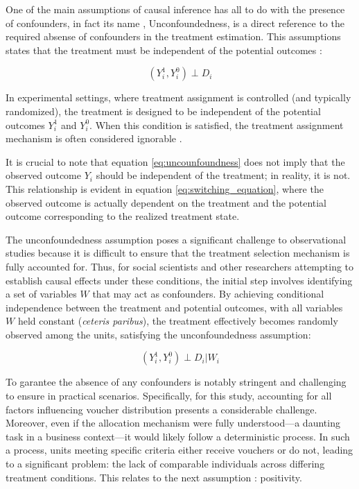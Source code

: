 One of the main assumptions of causal inference has all to do with the presence of confounders, in fact its name , Unconfoundedness, is a direct reference to the required absense of confounders in the treatment estimation. This
assumptions states that the treatment must be independent of the potential outcomes :

\begin{equation}
  (Y_i^1, Y_i^0) \perp D_i
  \label{eq:uncounfoundness}
\end{equation}

In experimental settings, where treatment assignment is controlled (and typically randomized), the treatment is designed to be independent of the potential outcomes $Y_i^1$ and $Y_i^0$. When this condition is satisfied, the 
treatment assignment mechanism is often considered ignorable \parencite{morgan_counterfactuals_2015}.

It is crucial to note that equation \ref{eq:uncounfoundness} does not imply that the observed outcome $Y_i$ should be independent of the treatment; in reality, it is not. This relationship is evident in equation 
\ref{eq:switching_equation}, where the observed outcome is actually dependent on the treatment and the potential outcome corresponding to the realized treatment state.

The unconfoundedness assumption poses a significant challenge to observational studies because it is difficult to ensure that the treatment selection mechanism is fully accounted for. Thus, for social scientists and other researchers 
attempting to establish causal effects under these conditions, the initial step involves identifying a set of variables $W$ that may act as confounders. By achieving conditional independence between the treatment and potential outcomes, with all variables 
$W$ held constant (\textit{ceteris paribus}), the treatment effectively becomes randomly observed among the units, satisfying the unconfoundedness assumption:

\begin{equation}
  (Y_i^1, Y_i^0) \perp D_i | W_i
  \label{eq:uncounfoundness_conditional}
\end{equation}

To garantee the absence of any confounders is notably stringent and challenging to ensure in practical scenarios. Specifically, for this study, accounting for all factors influencing voucher distribution presents a considerable challenge. 
Moreover, even if the allocation mechanism were fully understood—a daunting task in a business context—it would likely follow a deterministic process. In such a process, units meeting specific criteria either receive vouchers or 
do not, leading to a significant problem: the lack of comparable individuals across differing treatment conditions. This relates to the next assumption : positivity.

